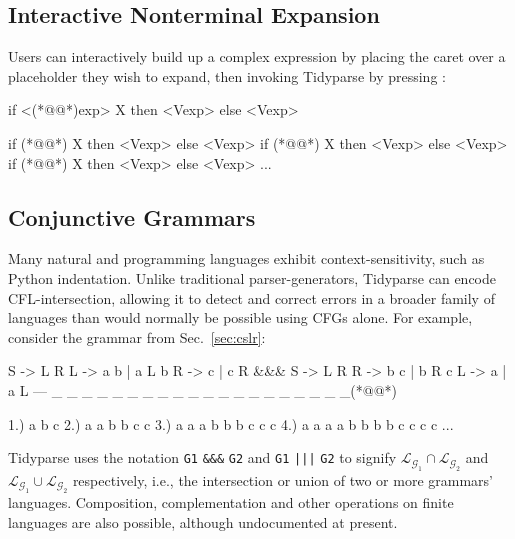 \documentclass[sigplan,review,anonymous,acmsmall]{acmart}\settopmatter{printfolios=false,printccs=false,printacmref=false}
\begin{document}
\subsection{Interactive Nonterminal Expansion}

Users can interactively build up a complex expression by placing the caret over a placeholder they wish to expand, then invoking Tidyparse by pressing \keys{\ctrl + \SPACE}:

\begin{tidyinput}
if <(*@@*)exp> X then <Vexp> else <Vexp>
\end{tidyinput}

\begin{tidyoutput}
if (*@@*) X then <Vexp> else <Vexp>
if (*@@*) X then <Vexp> else <Vexp>
if (*@@*) X then <Vexp> else <Vexp>
...
\end{tidyoutput}

\subsection{Conjunctive Grammars}

Many natural and programming languages exhibit context-sensitivity, such as Python indentation. Unlike traditional parser-generators, Tidyparse can encode CFL-intersection, allowing it to detect and correct errors in a broader family of languages than would normally be possible using CFGs alone. For example, consider the grammar from Sec.~\ref{sec:cslr}:

\begin{tidyinput}
S -> L R    L -> a b | a L b    R -> c | c R
&&&
S -> L R    R -> b c | b R c    L -> a | a L
---
_ _ _ _ _ _ _ _ _ _ _ _ _ _ _ _ _ _ _ _(*@\caret{ }@*)
\end{tidyinput}
\begin{tidyoutput}
1.) a b c
2.) a a b b c c
3.) a a a b b b c c c
4.) a a a a b b b b c c c c
...
\end{tidyoutput}

\noindent Tidyparse uses the notation \texttt{G1} {\color{blue}\texttt{\&\&\&}} \texttt{G2} and \texttt{G1} {\color{blue}\texttt{|||}} \texttt{G2} to signify $\mathcal{L}_{\mathcal{G}_1}\cap\mathcal{L}_{\mathcal{G}_2}$ and $\mathcal{L}_{\mathcal{G}_1}\cup\mathcal{L}_{\mathcal{G}_2}$ respectively, i.e., the intersection or union of two or more grammars' languages. {Composition}, complementation and other operations on finite languages are also possible, although undocumented at present.
\end{document}
